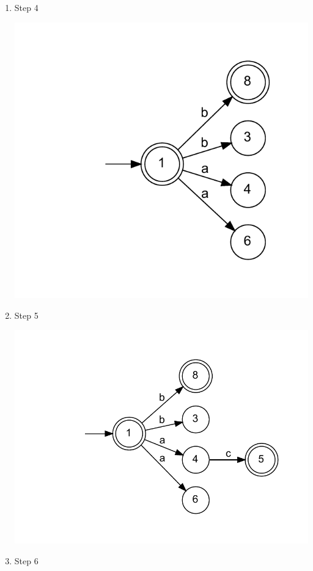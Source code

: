 \documentclass{article}
\begin{document}
\begin{enumerate}
\begin{center}
\end{center}
\item Step 4
\begin{center}
\includegraphics[width=\textwidth]{step4.dot.pdf}
\end{center}
\item Step 5
\begin{center}
\includegraphics[width=\textwidth]{step5.dot.pdf}
\end{center}
\item Step 6
\begin{center}

\end{center}
\end{enumerate}
\end{document}
